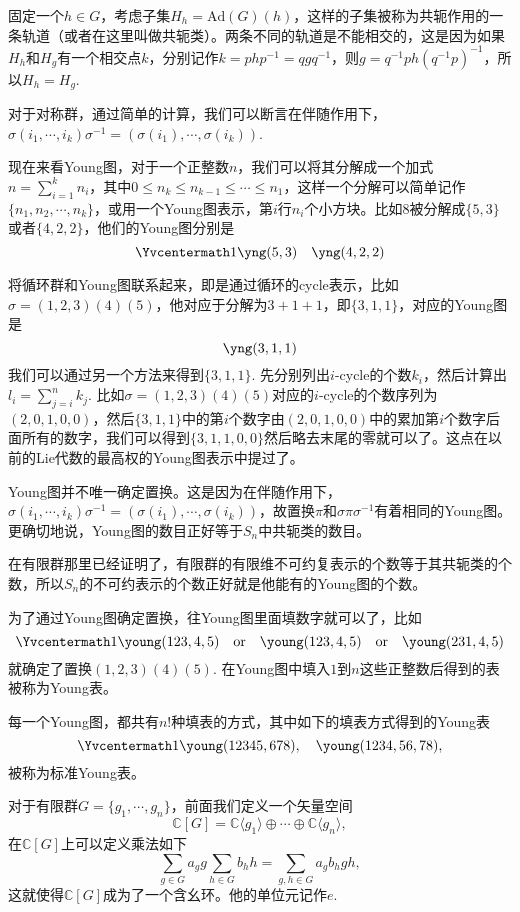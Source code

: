 \documentclass[9pt]{extarticle}
\newcommand{\cc}{\mathbb{C}}
\begin{document}
固定一个$h\in G$，考虑子集$H_h=\mathrm{Ad}(G)(h)$，这样的子集被称为共轭作用的一条轨道（或者在这里叫做共轭类）。两条不同的轨道是不能相交的，这是因为如果$H_h$和$H_g$有一个相交点$k$，分别记作$k=php^{-1}=qgq^{-1}$，则$g=q^{-1}ph(q^{-1}p)^{-1}$，所以$H_h=H_g$.

对于对称群，通过简单的计算，我们可以断言在伴随作用下，$\sigma (i_1,\cdots,i_k)\sigma^{-1}= (\sigma(i_1),\cdots,\sigma(i_k))$. 

\para 现在来看Young图，对于一个正整数$n$，我们可以将其分解成一个加式$n=\sum_{i=1}^k n_i$，其中$0\leq n_k\leq n_{k-1}\leq \cdots \leq n_1$，这样一个分解可以简单记作$\{n_1,n_2,\cdots,n_k\}$，或用一个Young图表示，第$i$行$n_i$个小方块。比如$8$被分解成$\{5,3\}$或者$\{4,2,2\}$，他们的Young图分别是
\[\Yvcentermath1
	\yng(5,3)\quad \yng(4,2,2)
\]

将循环群和Young图联系起来，即是通过循环的cycle表示，比如$\sigma=(1,2,3)(4)(5)$，他对应于分解为$3+1+1$，即$\{3,1,1\}$，对应的Young图是
\[
	\yng(3,1,1)
\]
我们可以通过另一个方法来得到$\{3,1,1\}$. 先分别列出$i$-cycle的个数$k_i$，然后计算出$l_i=\sum_{j=i}^nk_j$. 比如$\sigma=(1,2,3)(4)(5)$对应的$i$-cycle的个数序列为$(2,0,1,0,0)$，然后$\{3,1,1\}$中的第$i$个数字由$(2,0,1,0,0)$中的累加第$i$个数字后面所有的数字，我们可以得到$\{3,1,1,0,0\}$然后略去末尾的零就可以了。这点在以前的Lie代数的最高权的Young图表示中提过了。

Young图并不唯一确定置换。这是因为在伴随作用下，$\sigma (i_1,\cdots,i_k)\sigma^{-1}= (\sigma(i_1),\cdots,\sigma(i_k))$，故置换$\pi$和$\sigma\pi\sigma^{-1}$有着相同的Young图。更确切地说，Young图的数目正好等于$S_n$中共轭类的数目。

在有限群那里已经证明了，有限群的有限维不可约复表示的个数等于其共轭类的个数，所以$S_n$的不可约表示的个数正好就是他能有的Young图的个数。

\para 为了通过Young图确定置换，往Young图里面填数字就可以了，比如
\[\Yvcentermath1
	\young(123,4,5)\quad \text{or}\quad \young(123,4,5)\quad \text{or}\quad \young(231,4,5)
\]
就确定了置换$(1,2,3)(4)(5)$. 在Young图中填入$1$到$n$这些正整数后得到的表被称为Young表。

每一个Young图，都共有$n!$种填表的方式，其中如下的填表方式得到的Young表
\[\Yvcentermath1
	\young(12345,678),\quad \young(1234,56,78),
\]
被称为标准Young表。

\para 对于有限群$G=\{g_1,\cdots,g_n\}$，前面我们定义一个矢量空间
\[
	\cc [G]=\cc\langle g_1\rangle \oplus \cdots \oplus \cc\langle g_n\rangle,
\]
在$\cc [G]$上可以定义乘法如下
\[
	\sum_{g\in G} a_g g \sum_{h\in G} b_h h=\sum_{g,h\in G}a_gb_h gh,
\]
这就使得$\cc [G]$成为了一个含幺环。他的单位元记作$e$.
\end{document}
